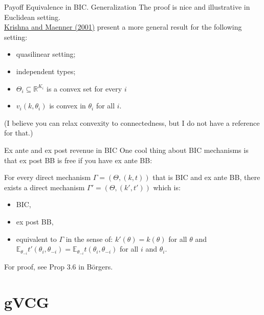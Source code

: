 \documentclass[english,10pt
,aspectratio=169
]{beamer}
\begin{document}
\begin{frame}{Payoff Equivalence in BIC. Generalization}
	The proof is nice and illustrative in Euclidean setting.\\ \href{https://onlinelibrary.wiley.com/doi/abs/10.1111/1468-0262.00233}{\uline{Krishna and Maenner (2001)}} present a more general result for the following setting:
	\begin{itemize}
		\item quasilinear setting;
		\item independent types;
		\item $\Theta_i \subseteq \mathbb{R}^{K_i}$ is a convex set for every $i$ 
		\item $v_i(k,\theta_i)$ is convex in $\theta_i$ for all $i$.
	\end{itemize}
	(I believe you can relax convexity to connectedness, but I do not have a reference for that.)
\end{frame}


\begin{frame}{Ex ante and ex post revenue in BIC}
	One cool thing about BIC mechanisms is that ex post BB is free if you have ex ante BB:
	\begin{theorem}
		For every direct mechanism $\Gamma = (\Theta, (k,t))$ that is BIC and \alert{ex ante BB}, there exists a direct mechanism $\Gamma' = (\Theta, (k',t'))$ which is:
		\begin{itemize}
			\item BIC,
			\item \alert{ex post BB},
			\item equivalent to $\Gamma$ in the sense of: $k'(\theta) = k(\theta)$ for all $\theta$ and $\mathbb{E}_{\theta_{-i}} t'(\theta_i,\theta_{-i}) = \mathbb{E}_{\theta_{-i}} t(\theta_i,\theta_{-i})$ for all $i$ and $\theta_i$.
		\end{itemize}
	\end{theorem}
	For proof, see Prop 3.6 in B{\"o}rgers.
\end{frame}


\section{gVCG}
\end{document}
